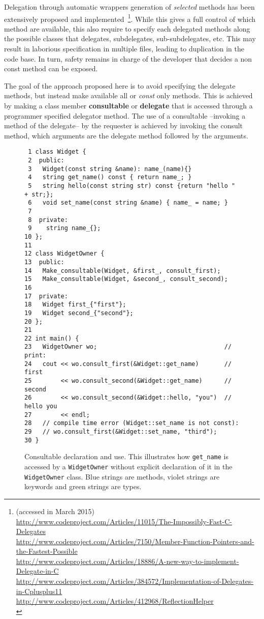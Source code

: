 \documentclass{article}
\begin{document}
Delegation through automatic wrappers generation of \textit{selected} methods has been extensively proposed and implemented~\footnote{(accessed in March 2015)\\
\url{http://www.codeproject.com/Articles/11015/The-Impossibly-Fast-C-Delegates}\\
\url{http://www.codeproject.com/Articles/7150/Member-Function-Pointers-and-the-Fastest-Possible}\\
\url{http://www.codeproject.com/Articles/18886/A-new-way-to-implement-Delegate-in-C}\\
\url{http://www.codeproject.com/Articles/384572/Implementation-of-Delegates-in-Cplusplus11}\\
\url{http://www.codeproject.com/Articles/412968/ReflectionHelper}\\
}.  While this gives a full control of which method are available, this also require to specify each delegated methods along the possible classes that delegates, subdelegates, sub-subdelegates, etc. This may result in laborious specification in multiple files, leading to duplication in the code base. In turn, safety remains in charge of the developer that decides a non const method can be exposed. 

The goal of the approach proposed here is to avoid specifying the delegate methods, but instead make available all or \textit{const} only methods. This is achieved by making a class member \textbf{consultable} or \textbf{delegate} that is accessed through a programmer specified delegator method. The use of a consultable --invoking a method of the delegate-- by the requester is achieved by invoking the consult method, which arguments are the delegate method followed by the arguments. 

\begin{figure}[ht]
{\small
\begin{lstlisting}
 1 class Widget {
 2  public:
 3   Widget(const string &name): name_(name){}
 4   string get_name() const { return name_; }
 5   string hello(const string str) const {return "hello " + str;};
 6   void set_name(const string &name) { name_ = name; }
 7 
 8  private:
 9    string name_{};
10 };
11 
12 class WidgetOwner {
13  public:
14   Make_consultable(Widget, &first_, consult_first);
15   Make_consultable(Widget, &second_, consult_second);
16 
17  private:
18   Widget first_{"first"};
19   Widget second_{"second"};
20 };
21 
22 int main() {
23   WidgetOwner wo;                                   // print:
24   cout << wo.consult_first(&Widget::get_name)       // first
25        << wo.consult_second(&Widget::get_name)      // second
26        << wo.consult_second(&Widget::hello, "you")  // hello you
27        << endl;
28   // compile time error (Widget::set_name is not const):
29   // wo.consult_first(&Widget::set_name, "third");
30 }
\end{lstlisting}}
\cprotect\caption{Consultable declaration and use. This illustrates how \verb+get_name+ is accessed by a \verb+WidgetOwner+ without explicit declaration of it in the \verb+WidgetOwner+ class. Blue strings are methods, violet strings are keywords and green strings are types.}
\label{example:basic}
\end{figure}
\end{document}
